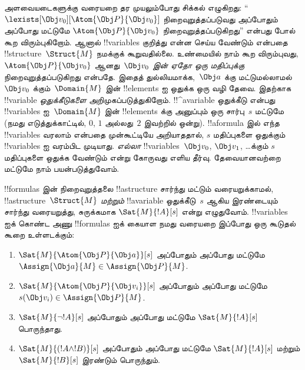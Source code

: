 \documentclass[../../../include/open-logic-section]{subfiles}
\begin{document}
அளவையடைகளுக்கு வரையறை தர முயலும்போது சிக்கல் எழுகிறது:
``$\lexists[\Obj v_0][\Atom{\Obj P}{\Obj v_0}]$ நிறைவுறுத்தப்படுவது அப்போதும்
அப்போது மட்டுமே $\Atom{\Obj P}{\Obj v_0}$ நிறைவுறுத்தப்படுகிறது'' என்பது
போல் கூற விரும்புகிறோம். ஆனால் !!{variable}s குறித்து என்ன செய்ய வேண்டும்
என்பதை !!{structure}~$\Struct{M}$ நமக்குக் கூறுவதில்லை. உண்மையில் நாம் கூற
விரும்புவது, $\Atom{\Obj P}{\Obj v_0}$ ஆனது~\emph{$\Obj v_0$ இன் ஏதோ ஒரு
மதிப்புக்கு} நிறைவுறுத்தப்படுகிறது என்பதே. இதைத் துல்லியமாக்க,~$\Obj a$ க்கு
மட்டுமல்லாமல்~$\Obj v_0$ க்கும்~$\Domain{M}$ இன் !!{element}s ஐ ஒதுக்க ஒரு
வழி தேவை. இதற்காக !!{variable} \emph{ஒதுக்கீடுகளை} அறிமுகப்படுத்துகிறோம்.
!!^a{variable} ஒதுக்கீடு என்பது !!{variable}s ஐ~$\Domain{M}$ இன்
!!{element}s க்கு அனுப்பும் ஒரு சார்பு~$s$ மட்டுமே (நமது எடுத்துக்காட்டில்,
$0$, $1$ அல்லது~$2$ இவற்றில் ஒன்று). !!a{formula} இல் எந்த !!{variable}s
வரலாம் என்பதை முன்கூட்டியே அறியாததால், $s$ மதிப்புகளை ஒதுக்கும்
!!{variable}s ஐ வரம்பிட முடியாது. \emph{எல்லா} !!{variable}s~$\Obj v_0$,
$\Obj v_1$, \dots\@ க்கும் $s$ மதிப்புகளை ஒதுக்க வேண்டும் என்று கோருவது
எளிய தீர்வு. தேவையானவற்றை மட்டுமே நாம் பயன்படுத்துவோம்.

!!{formula}s இன் நிறைவுறுத்தலை !!a{structure} சார்ந்து மட்டும் வரையறுக்காமல்,
!!a{structure}~$\Struct{M}$ \emph{மற்றும்} !!a{variable} ஒதுக்கீடு~$s$
ஆகிய இரண்டையும் சார்ந்து வரையறுத்து, சுருக்கமாக $\Sat{M}{!A}[s]$ என்று
எழுதுவோம். !!{variable}s ஐக் கொண்ட அணு !!{formula}s ஐக் கையாள நமது வரையறை
இப்போது ஒரு கூடுதல் கூறை உள்ளடக்கும்:
\begin{enumerate}
  \item $\Sat{M}{\Atom{\Obj P}{\Obj a}}[s]$ அப்போதும் அப்போது மட்டுமே
  $\Assign{\Obj a}{M} \in \Assign{\Obj P}{M}$.
  \item $\Sat{M}{\Atom{\Obj P}{\Obj v_i}}[s]$ அப்போதும் அப்போது மட்டுமே
  $s(\Obj v_i) \in \Assign{\Obj P}{M}$.
  \item $\Sat{M}{\lnot !A}[s]$ அப்போதும் அப்போது மட்டுமே
  $\Sat{M}{!A}[s]$ பொருந்தாது.
  \item $\Sat{M}{(!A \land !B)}[s]$ அப்போதும் அப்போது மட்டுமே
  $\Sat{M}{!A}[s]$ மற்றும் $\Sat{M}{!B}[s]$ இரண்டும் பொருந்தும்.
\end{enumerate}
\end{document}
